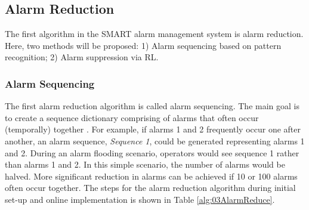 \subsection{Alarm Reduction}
The first algorithm in the SMART alarm management system is alarm reduction. Here, two methods will be proposed: 1) Alarm sequencing based on pattern recognition; 2) Alarm suppression via RL.

\subsubsection{Alarm Sequencing}
The first alarm reduction algorithm is called alarm sequencing.  The main goal is to create a sequence dictionary comprising of alarms that often occur (temporally) together \cite{alarm_sequence}.  For example, if alarms 1 and 2 frequently occur one after another, an alarm sequence, \emph{Sequence 1}, could be generated representing alarms 1 and 2. During an alarm flooding scenario, operators would see sequence 1 rather than alarms 1 and 2. In this simple scenario, the number of alarms would be halved.  More significant reduction in alarms can be achieved if 10 or 100 alarms often occur together.  The steps for the alarm reduction algorithm during initial set-up and online implementation is shown in Table \ref{alg:03AlarmReduce}.


